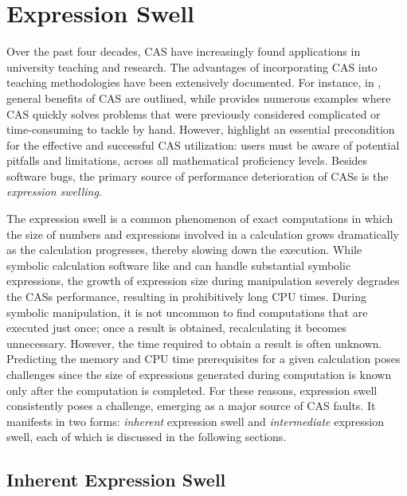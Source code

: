 
\section{Expression Swell}
\label{chap2:sec:expression_swell}

Over the past four decades, \ac{CAS} have increasingly found applications in university teaching and research. The advantages of incorporating \ac{CAS} into teaching methodologies have been extensively documented. For instance, in \citet{stoutemyer1984radical}, general benefits of \ac{CAS} are outlined, while \citet{pavelle1985macsyma} provides numerous examples where \ac{CAS} quickly solves problems that were previously considered complicated or time-consuming to tackle by hand. However, \citet{mitic1994pitfalls} highlight an essential precondition for the effective and successful \ac{CAS} utilization: users must be aware of potential pitfalls and limitations, across all mathematical proficiency levels. Besides software bugs, the primary source of performance deterioration of \acp{CAS} is the \emph{expression swelling}.

The expression swell is a common phenomenon of exact computations in which the size of numbers and expressions involved in a calculation grows dramatically as the calculation progresses, thereby slowing down the execution. While symbolic calculation software like \Maple{} and \Mathematica{} can handle substantial symbolic expressions, the growth of expression size during manipulation severely degrades the \acp{CAS} performance, resulting in prohibitively long \ac{CPU} times. During symbolic manipulation, it is not uncommon to find computations that are executed just once; once a result is obtained, recalculating it becomes unnecessary. However, the time required to obtain a result is often unknown. Predicting the memory and \ac{CPU} time prerequisites for a given calculation poses challenges since the size of expressions generated during computation is known only after the computation is completed. For these reasons, expression swell consistently poses a challenge, emerging as a major source of \ac{CAS} faults. It manifests in two forms: \emph{inherent} expression swell and \emph{intermediate} expression swell, each of which is discussed in the following sections.

\subsection{Inherent Expression Swell}

